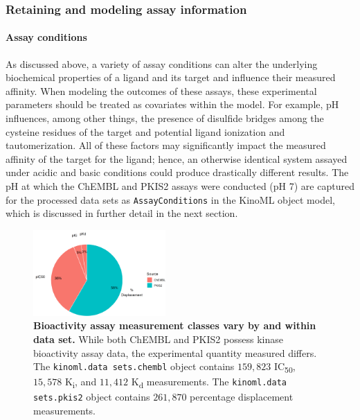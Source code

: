\documentclass[9pt,lessons]{livecoms}
\begin{document}
\subsubsection{Retaining and modeling assay information}

\paragraph{Assay conditions}

As discussed above, a variety of assay conditions can alter the underlying biochemical properties of a ligand and its target and influence their measured affinity. When modeling the outcomes of these assays, these experimental parameters should be treated as covariates within the model. For example, pH influences, among other things, the presence of disulfide bridges among the cysteine residues of the target and potential ligand ionization and tautomerization. All of these factors may significantly impact the measured affinity of the target for the ligand; hence, an otherwise identical system assayed under acidic and basic conditions could produce drastically different results. The pH at which the ChEMBL and PKIS2 assays were conducted (pH 7) are captured for the processed data sets as \texttt{AssayConditions} in the KinoML object model, which is discussed in further detail in the next section.

\begin{figure}[bph]
    \centering
    \includegraphics[width=0.45\textwidth]{figures/measurement_piechart.png}
    \caption{\label{figure:piechart}
    {\bf Bioactivity assay measurement classes vary by and within data set. } While both ChEMBL and PKIS2 possess kinase bioactivity assay data, the experimental quantity measured differs. The \texttt{kinoml.data sets.chembl} object contains $159,823$ IC\textsubscript{50}, $15,578$ K\textsubscript{i}, and $11,412$ K\textsubscript{d} measurements. The \texttt{kinoml.data sets.pkis2} object contains $261,870$ percentage displacement measurements.}
\end{figure}
\end{document}
